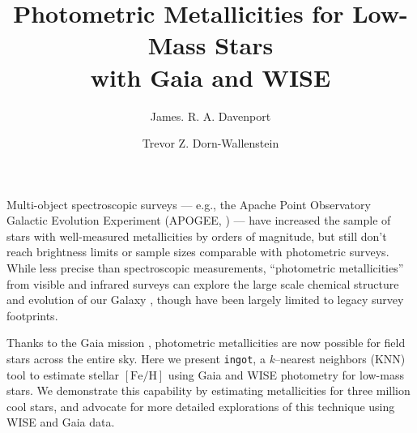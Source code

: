 \documentclass[modern]{rnaastex}
\newcommand{\ingot}{{\tt ingot}\xspace} %
\newcommand{\feh}{$[\mathrm{Fe}/\mathrm{H}]$\xspace}
\begin{document}
\title{Photometric Metallicities for Low-Mass Stars\\ with Gaia and WISE}


\author[0000-0002-0637-835X]{James. R. A. Davenport}

\author[0000-0003-3601-3180]{Trevor Z. Dorn-Wallenstein}



\section{} 


Multi-object spectroscopic surveys --- e.g., the Apache Point Observatory Galactic Evolution Experiment (APOGEE, \citealt{majewski17}) --- have increased the sample of stars with well-measured metallicities by orders of magnitude, but still don't reach brightness limits or sample sizes comparable with photometric surveys. While less precise than spectroscopic measurements, ``photometric metallicities'' from visible and infrared surveys can explore the large scale chemical structure and evolution of our Galaxy \citep[e.g.][]{ivezic08,schmidt16}, though have been largely limited to legacy survey footprints.

Thanks to the Gaia mission \citep{gaia_dr2}, photometric metallicities are now possible for field stars across the entire sky. Here we present \ingot, a {\it k}--nearest neighbors (KNN) tool to estimate stellar \feh using Gaia and WISE photometry for low-mass stars. We demonstrate this capability by estimating metallicities for three million cool stars, and advocate for more detailed explorations of this technique using WISE and Gaia data.
\end{document}
